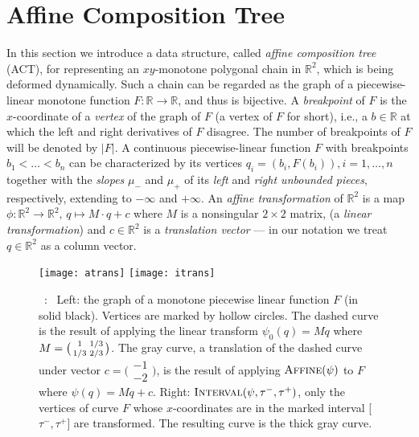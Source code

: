 \documentclass[11pt]{article}
\def\tvec{c}
\def\amat{M}
\def\qq{q}
\def\reals{\mathbb{R}}
\def\atrans{\mathop{\textsc{Affine}}}
\def\itrans{\mathop{\textsc{Interval}}}
\newcommand\myCaption[1]{\small\refstepcounter{figure}\figurename\ \thefigure :\ #1}
\begin{document}
\section{Affine Composition Tree}\label{sec:datastructure}

In this section we introduce a data structure, called \emph{affine 
composition tree} (ACT), for representing an 
$xy$-monotone polygonal chain in $\reals^2$, which is being deformed 
dynamically. Such a chain can be regarded as the graph of a 
piecewise-linear monotone function $F:\reals\rightarrow \reals$, and thus is bijective. 
A {\em breakpoint} of $F$ is the $x$-coordinate of a {\em vertex} of 
the graph of $F$ (a vertex of $F$ for short), i.e., a 
$b \in \reals$ at which the left and right derivatives of $F$ disagree. The number of breakpoints of $F$ will be denoted by $|F|$. 
 A continuous piecewise-linear function $F$ with breakpoints 
$b_1 < \dots < b_n$ can be characterized by its vertices 
$\qq_i = (b_i, F(b_i)), i = 1, \dots, n$ together with the {\em slopes}
$\mu_-$ and $\mu_+$ of its {\em left} and {\em right unbounded pieces},
respectively, extending to $-\infty$ and $+\infty$. 
An {\em affine transformation} of $\reals^2$ is a map 
$\phi: \reals^2 \rightarrow \mathbb{R}^2,\, \qq \mapsto \amat 
\cdot \qq + \tvec$ where $\amat$ is a nonsingular $2\times 2$ matrix, 
(a {\em linear transformation\/}) and $\tvec \in \reals^2$ is a 
{\em translation vector} --- in our notation we treat 
$\qq \in \reals^2$ as a column vector.


\begin{figure}
\begin{center}
\texttt{[image: atrans]}\qquad\qquad
\texttt{[image: itrans]}
\end{center}
\myCaption{\label{fig:trans} Left: the graph of a monotone piecewise 
linear function $F$ (in solid black). Vertices are marked by hollow 
circles. The dashed curve is the result of applying the linear 
transform $\psi_0(\qq) = \amat \qq$ where $\amat = 
\bigl(\protect\begin{smallmatrix}1 & 1/3 \\ 1/3 & 
	2/3\end{smallmatrix}\bigr)$. 
The gray curve, a translation of the dashed curve under vector 
$\tvec = \bigl(\begin{smallmatrix}-1 \\ -2\end{smallmatrix}\bigr)$, is the 
result of applying $\atrans(\psi)$ to $F$ where $\psi(\qq) = \amat \qq + \tvec$. 
Right: $\itrans(\psi, \tau^-, \tau^+)$, only the vertices of curve $F$ 
whose $x$-coordinates are in the marked interval [$\tau^-, \tau^+]$ 
are transformed. The resulting curve is the thick gray curve. }
\end{figure}
\end{document}
